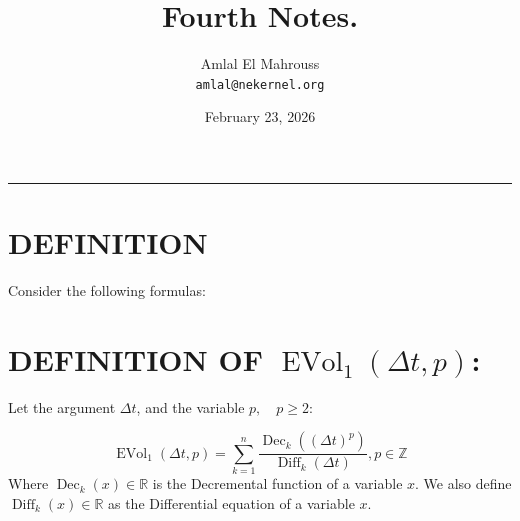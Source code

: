 \documentclass[11pt, a4paper]{article}
\title{Fourth Notes.}
\author{Amlal El Mahrouss\\\texttt{amlal@nekernel.org}}
\date{February 23, 2026}
\begin{document}
\maketitle

\begin{center}
	\rule[0.01cm]{17cm}{0.01cm}
\end{center}

\section{DEFINITION}

Consider the following formulas: 

\section{DEFINITION OF $\operatorname{EVol}_{1}(\Delta t, p)$:}

Let the argument $\Delta t$, and the variable $p, \quad p \geq 2$:

\begin{equation}
    \operatorname{EVol}_{1}(\Delta t, p) = \sum_{k=1}^{n} \frac{\operatorname{Dec}_{k}((\Delta t)^{p})}{\operatorname{Diff}_{k}(\Delta t)}, p \in \mathbb{Z}
\end{equation}
Where $\operatorname{Dec}_{k}(x) \in \mathbb{R}$ is the Decremental function of a variable $x$. We also define $\operatorname{Diff}_{k}(x) \in \mathbb{R}$ as the Differential equation of a variable $x$.
\end{document}
